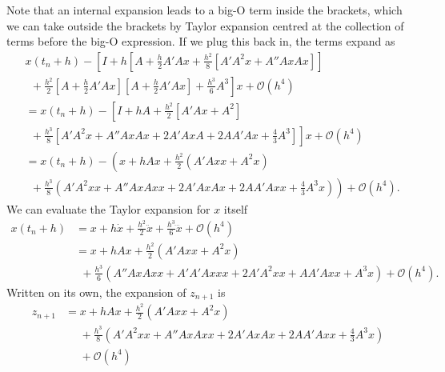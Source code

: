 Note that an internal expansion leads to a big-O term inside the brackets,
which we can take outside the brackets by Taylor expansion centred at the collection of terms before the big-O expression.
If we plug this back in, the terms expand as
\begin{align*}
    &x(t_n + h) - \left[ I + h \left[ A + \frac{h}{2}A' A x + \frac{h^2}{8} \left[ A' A^2 x + A'' Ax Ax \right] \right] \right. \\
    &~~ + \left. \frac{h^2}{2} \left[ A + \frac{h}{2}A'Ax \right]\left[ A + \frac{h}{2}A'Ax \right] + \frac{h^3}{6}A^3 \right] x + \mathcal{O}(h^4) \\
    &= x(t_n + h) - \left[ I + hA + \frac{h^2}{2} \left[ A' Ax + A^2 \right] \right. \\
    &~~ + \left. \frac{h^3}{8} \left[ A' A^2 x + A'' Ax Ax + 2A'AxA + 2AA'Ax + \frac{4}{3}A^3 \right] \right]x + \mathcal{O}(h^4) \\
    &= x(t_n + h) - \left( x + hAx + \frac{h^2}{2} \left( A' Axx + A^2x \right) \right. \\
    &~~ + \left. \frac{h^3}{8} \left( A' A^2 xx + A'' Ax Ax x + 2A'AxAx + 2AA'Axx + \frac{4}{3}A^3x \right) \right) + \mathcal{O}(h^4).
\end{align*}
We can evaluate the Taylor expansion for $x$ itself
\begin{equation}
    \begin{aligned}
        x(t_n + h) &= x + h \dot{x} + \frac{h^2}{2}\ddot{x} + \frac{h^3}{6}\dddot{x} + \mathcal{O}(h^4) \\
        &= x + hAx + \frac{h^2}{2}\left( A'Axx + A^2x \right) \\
        &~~ + \frac{h^3}{6} \left( A''AxAxx + A'A'A xxx + 2A'A^2 xx + A A' A xx + A^3 x \right) + \mathcal{O}(h^4).
    \end{aligned}
    \label{eqn:thirdorderexpansion}
\end{equation}
Written on its own, the expansion of $z_{n+1}$ is
\begin{equation}
    \begin{aligned}
        z_{n+1} &= x + h Ax + \frac{h^2}{2} \left( A' A xx + A^2 x \right) \\
        &~~~~~~ + \frac{h^3}{8} \left(
            A' A^2 xx + A'' Ax Ax x + 2 A' Ax Ax + 2 A A' A xx + \frac{4}{3}A^3 x
            \right) \\
        &~~~~~~ + \mathcal{O}(h^4)
    \end{aligned}
    \label{eqn:strangzpanda}
\end{equation}
